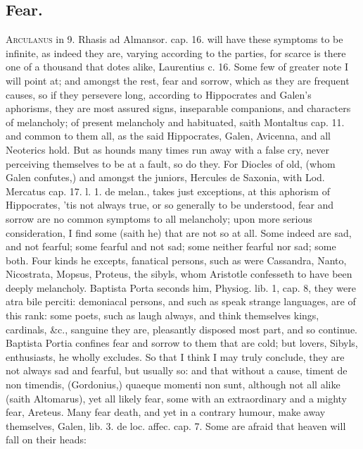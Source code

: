 {\subsection{Fear.}
\lettrine{A}{rculanus} in 9. Rhasis ad Almansor. cap. 16. will have these
symptoms to be infinite, as indeed they are, varying according to the
parties, for scarce is there one of a thousand that dotes alike, 
Laurentius c. 16. Some few of greater note I will point at; and amongst
the rest, fear and sorrow, which as they are frequent causes, so if
they persevere long, according to Hippocrates and Galen's
aphorisms, they are most assured signs, inseparable companions, and
characters of melancholy; of present melancholy and habituated, saith
Montaltus cap. 11. and common to them all, as the said Hippocrates,
Galen, Avicenna, and all Neoterics hold. But as hounds many times run
away with a false cry, never perceiving themselves to be at a fault, so
do they. For Diocles of old, (whom Galen confutes,) and amongst the
juniors, Hercules de Saxonia, with Lod. Mercatus cap. 17. l. 1.
de melan., takes just exceptions, at this aphorism of Hippocrates, 'tis
not always true, or so generally to be understood, fear and sorrow are
no common symptoms to all melancholy; upon more serious consideration,
I find some (saith he) that are not so at all. Some indeed are sad, and
not fearful; some fearful and not sad; some neither fearful nor sad;
some both. Four kinds he excepts, fanatical persons, such as were
Cassandra, Nanto, Nicostrata, Mopsus, Proteus, the sibyls, whom
Aristotle confesseth to have been deeply melancholy. Baptista
Porta seconds him, Physiog. lib. 1, cap. 8, they were atra bile
perciti: demoniacal persons, and such as speak strange languages, are
of this rank: some poets, such as laugh always, and think themselves
kings, cardinals, \&c., sanguine they are, pleasantly disposed most
part, and so continue. Baptista Portia confines fear and sorrow
to them that are cold; but lovers, Sibyls, enthusiasts, he wholly
excludes. So that I think I may truly conclude, they are not always sad
and fearful, but usually so: and that without a cause, timent de
non timendis, (Gordonius,) quaeque momenti non sunt, although not all
alike (saith Altomarus), yet all likely fear, some with an
extraordinary and a mighty fear, Areteus. Many fear death, and
yet in a contrary humour, make away themselves, Galen, lib. 3. de loc.
affec. cap. 7. Some are afraid that heaven will fall on their heads:
}
